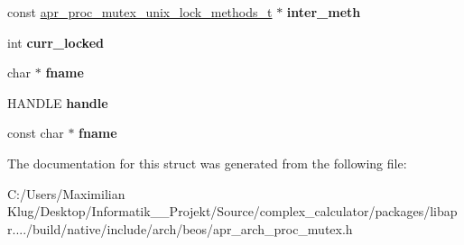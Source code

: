 \begin{DoxyCompactItemize}
\item 
\mbox{\label{structapr__proc__mutex__t_a6cbc468652a5f21d08967a2110e21a23}} 
const \mbox{\hyperlink{structapr__proc__mutex__unix__lock__methods__t}{apr\+\_\+proc\+\_\+mutex\+\_\+unix\+\_\+lock\+\_\+methods\+\_\+t}} $\ast$ {\bfseries inter\+\_\+meth}
\item 
\mbox{\label{structapr__proc__mutex__t_a26e8e0e38a96aa54d827aa4d0e8fba32}} 
int {\bfseries curr\+\_\+locked}
\item 
\mbox{\label{structapr__proc__mutex__t_a7c4019c25a6cdc4a40fa7f70902fc754}} 
char $\ast$ {\bfseries fname}
\item 
\mbox{\label{structapr__proc__mutex__t_ac5471e5085612911934fc86c8375a1b3}} 
H\+A\+N\+D\+LE {\bfseries handle}
\item 
\mbox{\label{structapr__proc__mutex__t_ab42ae50b9d7ad38bf1c2b8ca9e6efb2f}} 
const char $\ast$ {\bfseries fname}
\end{DoxyCompactItemize}


The documentation for this struct was generated from the following file\+:\begin{DoxyCompactItemize}
\item 
C\+:/\+Users/\+Maximilian Klug/\+Desktop/\+Informatik\+\_\+\_\+\+Projekt/\+Source/complex\+\_\+calculator/packages/libapr..../build/native/include/arch/beos/apr\+\_\+arch\+\_\+proc\+\_\+mutex.\+h\end{DoxyCompactItemize}
